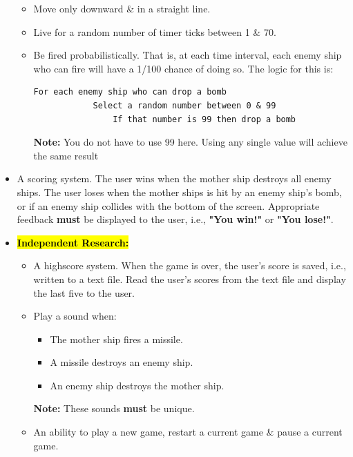 \documentclass{article}
\begin{document}
\begin{itemize}
\begin{itemize}
        \item Move only downward \& in a straight line.
        \item Live for a random number of timer ticks between 1 \& 70.
        \item Be fired probabilistically. That is, at each time interval, each enemy ship who can fire will have a 1/100 chance of doing so. The logic for this is:
        \begin{Verbatim}[tabsize=2]
        For each enemy ship who can drop a bomb
            Select a random number between 0 & 99
                If that number is 99 then drop a bomb   
        \end{Verbatim}
        \textbf{Note:} You do not have to use 99 here. Using any single value will achieve the same result
    \end{itemize}
    \item A scoring system. The user wins when the mother ship destroys all enemy ships. The user loses when the mother ships is hit by an enemy ship's bomb, or if an enemy ship collides with the bottom of the screen. Appropriate feedback \textbf{must} be displayed to the user, i.e., \textbf{"You win!"} or \textbf{"You lose!"}.
    \item \hl{\textbf{Independent Research:}}
    \begin{itemize}
        \item A highscore system. When the game is over, the user's score is saved, i.e., written to a text file. Read the user's scores from the text file and display the last five to the user.
        \item Play a sound when:
        \begin{itemize}
            \item The mother ship fires a missile.
            \item A missile destroys an enemy ship.
            \item An enemy ship destroys the mother ship.
        \end{itemize}
        \textbf{Note:} These sounds \textbf{must} be unique.
        \item An ability to play a new game, restart a current game \& pause a current game.
    \end{itemize}
\end{itemize}
\end{document}
